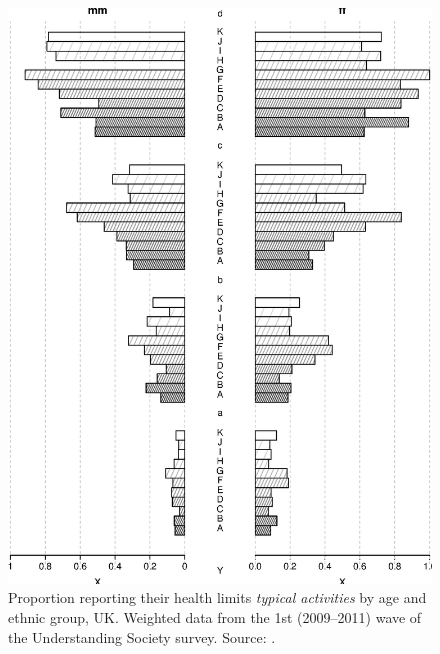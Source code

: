 \documentclass[11 pt, a4paper]{report}
\begin{document}
\begin{figure}[hbtp!]
\includegraphics[width=\textwidth]{../figures/Fig8.10.eps}
\caption{Proportion reporting their health limits \emph{typical activities} by age and ethnic group, UK. Weighted data from the 1st (2009--2011) wave of the Understanding Society  survey. Source: \citet{UoE2015}.}\label{Fig:US01} %
\end{figure}
\end{document}
